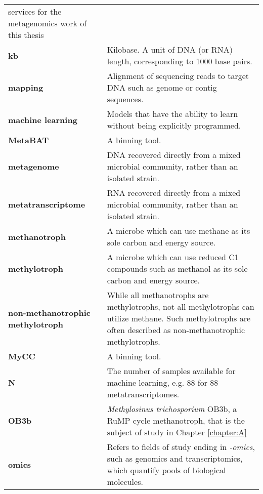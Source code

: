 \begin{singlespace}
\begin{longtable}{ p{}  p{} }
                services for the metagenomics work of this thesis \\
\textbf{kb} & Kilobase. A unit of DNA (or RNA) length, corresponding to 1000 base pairs. \\
\textbf{mapping} & Alignment of sequencing reads to target DNA such as genome or contig sequences.\\
\textbf{machine learning} & Models that have the ability to learn without being explicitly programmed. \\
\textbf{MetaBAT} &  A binning tool. \\
\textbf{metagenome} & DNA recovered directly from a mixed microbial community, rather than an isolated strain. \\
\textbf{metatranscriptome} & RNA recovered directly from a mixed microbial community, rather than an isolated strain. \\
\textbf{methanotroph} & A microbe which can use methane as its sole carbon and energy source. \\
\textbf{methylotroph} & A microbe which can use reduced C1 compounds such as methanol as its sole carbon and energy source. \\
\textbf{non-methanotrophic methylotroph} & While all methanotrophs are methylotrophs, not all methylotrophs can utilize methane.
	Such methylotrophs are often described as non-methanotrophic methylotrophs. \\
\textbf{MyCC} & A binning tool. \\
\textbf{N} & The number of samples available for machine learning, e.g. 88 for 88 metatranscriptomes. \\
\textbf{OB3b} & \textit{Methylosinus trichosporium} {OB3b}, a RuMP cycle methanotroph, that is the subject of study in Chapter \ref{chapter:A}  \\
\textbf{omics} & Refers to fields of study ending in \textit{-omics}, such as genomics and transcriptomics, which quantify pools of biological molecules. \\

\end{longtable}
\end{singlespace}
